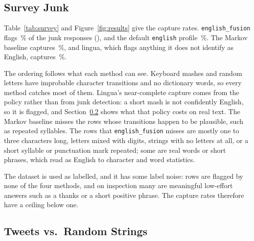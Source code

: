 \documentclass[10pt,twocolumn]{article}
\newcommand{\code}[1]{\texttt{#1}}
\newcommand{\SJ}{Survey Junk}
\newcommand{\TRS}{Tweets vs.\ Random Strings}
\begin{document}
\subsection{\SJ}
\label{sec:survey}

\begin{table}[t]
\centering
\small
\caption{Capture rate on \SJ{}: the share of \nA{} junk responses each
method flags at its default decision, with 95\,\% bootstrap intervals.
The two pygarble rows are the same library run with different profiles,
whose names are set in typewriter. Lingua flags a text when the detected
language is not English. * best, ** second best per column.}
\label{tab:survey}

\end{table}

Table~\ref{tab:survey} and Figure~\ref{fig:results} give the capture
rates. \code{english\_fusion}
flags \,\% of the junk responses
(), and the default \code{english}
profile \,\%. The Markov baseline captures
\,\%, and lingua, which flags
anything it does not identify as English, captures
\,\%.

The ordering follows what each method can see. Keyboard mashes and
random letters have improbable character transitions and no dictionary
words, so every method catches most of them. Lingua's near-complete
capture comes from the policy rather than from junk detection: a
short mash is not confidently English, so it is flagged, and
Section~\ref{sec:tweets} shows what that policy costs on real text. The
Markov baseline misses the rows whose transitions happen to be plausible,
such as repeated syllables. The \nAmissedfusion{} rows that
\code{english\_fusion} misses are mostly one to three characters long,
letters mixed with digits, strings with no letters at all, or a short
syllable or punctuation mark repeated; some are real words or short
phrases, which read as English to character and word statistics.

The dataset is used as labelled, and it has some label noise:
\nAmissedall{} rows are flagged by none of the four methods, and
on inspection many are meaningful low-effort answers such as a thanks or
a short positive phrase. The capture rates therefore have a ceiling
below one.

\subsection{\TRS}
\label{sec:tweets}
\end{document}
